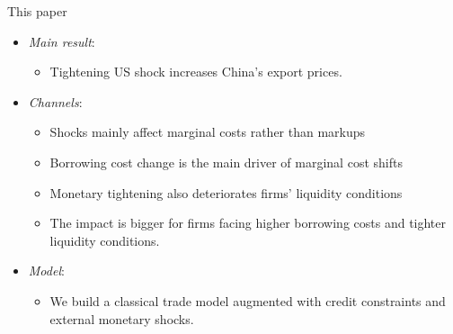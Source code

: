 \documentclass[10pt]{beamer}
\begin{document}
\begin{frame}{This paper}

\begin{itemize}
    \item \textit{Main result}: 
        \begin{itemize}
        \item Tightening US shock increases China's export prices.
        \end{itemize}
    \medskip
    \item \textit{Channels}: 
    \begin{itemize}
        \item Shocks mainly affect marginal costs rather than markups
        \item Borrowing cost change is the main driver of marginal cost shifts
        \item Monetary tightening also deteriorates firms' liquidity conditions
        \item The impact is bigger for firms facing higher borrowing costs and tighter liquidity conditions. 
    \end{itemize}
    \medskip
    \item \textit{Model}: 
        \begin{itemize}
        \item We build a classical trade model augmented with credit constraints and external monetary shocks.
        \end{itemize}
        
\end{itemize}
\end{frame}
\end{document}
